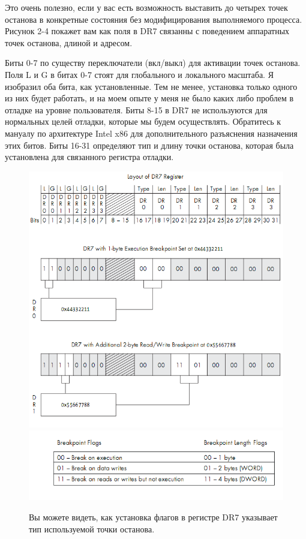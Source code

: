 \documentclass[12pt]{book}
\begin{document}
Это очень полезно, если у вас есть возможность выставить до четырех точек останова в конкретные состояния без модифицирования выполняемого процесса. Рисунок 2-4 покажет вам как поля в DR7 связанны с поведением аппаратных точек останова, длиной и адресом.

Биты 0-7 по существу переключатели (вкл/выкл) для активации точек останова. Поля L и G в битах 0-7 стоят для глобального и локального масштаба. Я изобразил оба бита, как установленные. Тем не менее, установка только одного из них будет работать, и на моем опыте у меня не было каких либо проблем в отладке на уровне пользователя. Биты 8-15 в DR7 не используются для нормальных целей отладки, которые мы будем осуществлять. Обратитесь к мануалу по архитектуре Intel x86 для дополнительного разъяснения назначения этих битов. Биты 16-31 определяют тип и длину точки останова, которая была установлена для связанного регистра отладки.

\begin{figure}
  \center
  \includegraphics{./pic/chap2/4.PNG}
  \includegraphics{./pic/chap2/5.PNG}
  \caption{Вы можете видеть, как установка флагов в регистре DR7 указывает тип используемой точки останова.}
\end{figure}
\end{document}
